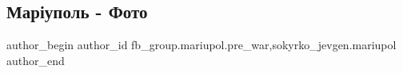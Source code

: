  
 
 
 
 

\subsection{Маріуполь - Фото}
\label{sec:20_01_2023.fb.fb_group.mariupol.pre_war.2.mar_upol___foto}
 
\ifcmt
 author_begin
   author_id fb_group.mariupol.pre_war,sokyrko_jevgen.mariupol
 author_end
\fi
